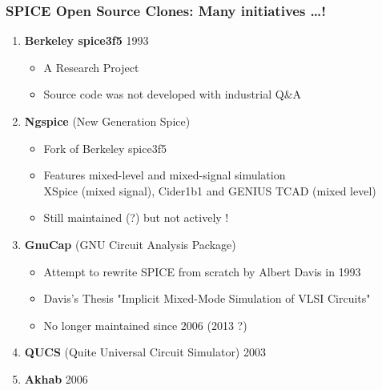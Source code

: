 
\begin{frame}
  \frametitle{SPICE Open Source Clones: Many initiatives \ldots !}
  \begin{enumerate}
  \item \textbf{Berkeley spice3f5} \alert{1993} %
    \begin{itemize}
    \item A Research Project
    \item Source code \alert{was not developed with industrial Q\&A}
    \end{itemize}
  \item \textbf{Ngspice} (New Generation Spice)
    \begin{itemize}
    \item \alert{Fork of Berkeley spice3f5}
    \item Features mixed-level and mixed-signal simulation \\
      XSpice (mixed signal), Cider1b1 and GENIUS TCAD (mixed level)
    \item \alert{Still maintained (?) but not actively !}
    \end{itemize}
  \item \textbf{GnuCap} (GNU Circuit Analysis Package)
    \begin{itemize}
    \item Attempt to rewrite SPICE from scratch by Albert Davis in \alert{1993}
    \item Davis's Thesis "Implicit Mixed-Mode Simulation of VLSI Circuits"
    \item No longer maintained since 2006 (2013 ?)
    \end{itemize}
  \item \textbf{QUCS} (Quite Universal Circuit Simulator) \alert{2003}
  \item \textbf{Akhab} \alert{2006}
  \end{enumerate}
\end{frame}


